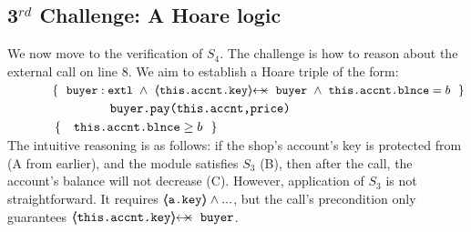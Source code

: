   
  \subsection{3$^{rd}$ Challenge:  A Hoare logic} %
 \label{sec:howThird}


 
 \vspace{.1cm}
 
We now move to the  verification of $S_4$. 
The challenge is how to reason  about the external call on line 8. %
% 
%
% 
We aim to establish a Hoare triple of the form:
 \\
$\strut \ \ \ \ \ \ \ \ \ \ \  \{\  \ { \external{\prg{buyer}}} \ \wedge\ {\protectedFrom {\prg{this.\myAccount.key}} {\prg{buyer}}\ \wedge\ {\prg{this.\myAccount.\balance}}= b    }\ \  \}$\\
$\strut \ \ \ \ \ \ \ \ \ \ \   \ \ \ \ \ \ \ \ \ \ \ \ {\ \prg{buyer.pay(this.accnt,price)}   \ } $\\
$\strut \ \ \ \ \ \ \ \ \ \ \  \{\  \ \  {\prg{this.\myAccount.\balance}} \geq  b \  \  \}$ 
\\
The intuitive reasoning is as follows: if the shop's account's key is protected from  (A from earlier), and the module satisfies $S_3$ (B), then after the call, the account's balance will not decrease (C).
%
However, application of $S_3$ is not straightforward. 
It requires ${\langle\!\!\langle \mbox{\normalfont{\texttt{a.key}}} \rangle\!\!\rangle} \wedge ...$,  but  the call's precondition only guarantees $\protectedFrom{\prg{this.\myAccount.key}}{\prg{buyer}}$. 


